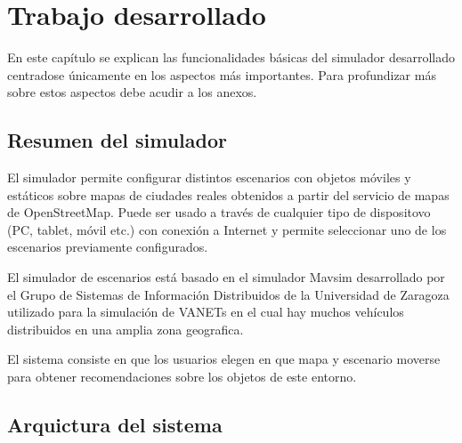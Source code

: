 \chapter{Trabajo desarrollado}
\thispagestyle{empty}

En este capítulo se explican las funcionalidades básicas del simulador desarrollado centradose únicamente en los aspectos más importantes. Para profundizar más sobre estos aspectos debe acudir a los anexos.

\section{Resumen del simulador}
\thispagestyle{empty}

El simulador permite configurar distintos escenarios con objetos móviles y estáticos sobre mapas de ciudades reales obtenidos a partir del servicio de mapas de OpenStreetMap. Puede ser usado a través de cualquier tipo de dispositovo (PC, tablet, móvil etc.) con conexión a Internet y permite seleccionar uno de los escenarios previamente configurados.

El simulador de escenarios está basado en el simulador Mavsim desarrollado por el Grupo de Sistemas de Información Distribuidos de la Universidad de Zaragoza utilizado para la simulación de VANETs en el cual hay muchos vehículos distribuidos en una amplia zona geografica.

El sistema consiste en que los usuarios elegen en que mapa y escenario moverse para obtener recomendaciones sobre los objetos de este entorno.

\section{Arquictura del sistema}
\thispagestyle{empty}



